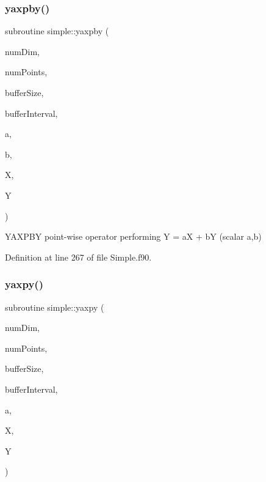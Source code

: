 \subsubsection{\texorpdfstring{yaxpby()}{yaxpby()}}
{\footnotesize\ttfamily subroutine simple\+::yaxpby (\begin{DoxyParamCaption}\item[{integer(kind=4), intent(in)}]{num\+Dim,  }\item[{integer(kind=8), intent(in)}]{num\+Points,  }\item[{integer(kind=8), dimension(numdim), intent(in)}]{buffer\+Size,  }\item[{integer(kind=8), dimension(2$\ast$numdim), intent(in)}]{buffer\+Interval,  }\item[{real(kind=8), intent(in)}]{a,  }\item[{real(kind=8), intent(in)}]{b,  }\item[{real(kind=8), dimension(numpoints), intent(in)}]{X,  }\item[{real(kind=8), dimension(numpoints), intent(inout)}]{Y }\end{DoxyParamCaption})}



Y\+A\+X\+P\+BY point-\/wise operator performing Y = aX + bY (scalar a,b) 



Definition at line 267 of file Simple.\+f90.

\hypertarget{namespacesimple_a3875a3210180971c306698e973f5fc2e}{}\label{namespacesimple_a3875a3210180971c306698e973f5fc2e} 
\subsubsection{\texorpdfstring{yaxpy()}{yaxpy()}}
{\footnotesize\ttfamily subroutine simple\+::yaxpy (\begin{DoxyParamCaption}\item[{integer(kind=4), intent(in)}]{num\+Dim,  }\item[{integer(kind=8), intent(in)}]{num\+Points,  }\item[{integer(kind=8), dimension(numdim), intent(in)}]{buffer\+Size,  }\item[{integer(kind=8), dimension(2$\ast$numdim), intent(in)}]{buffer\+Interval,  }\item[{real(kind=8), intent(in)}]{a,  }\item[{real(kind=8), dimension(numpoints), intent(in)}]{X,  }\item[{real(kind=8), dimension(numpoints), intent(inout)}]{Y }\end{DoxyParamCaption})}



